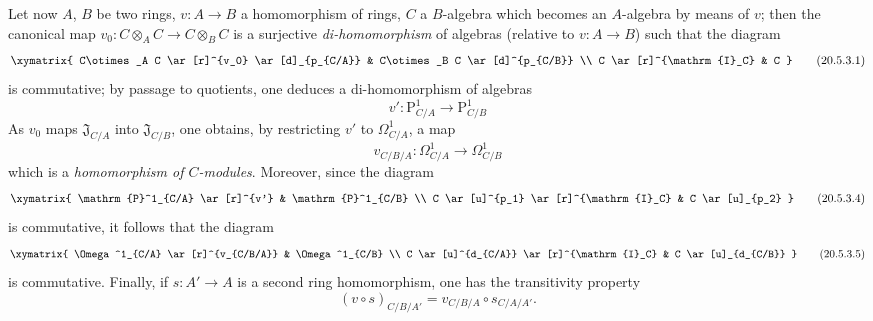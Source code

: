 \begin{env}[20.5.3]
\label{0.20.5.3}
Let now $A$, $B$ be two rings, $v:A\to B$ a homomorphism of rings, $C$ a $B$-algebra which becomes an $A$-algebra by means of $v$; then the canonical map $v_0:C\otimes_A C\to C\otimes_B C$ is a surjective \emph{di-homomorphism} of algebras (relative to $v:A\to B$) such that the diagram
\[
\xymatrix{
  C\otimes_A C \ar[r]^{v_0} \ar[d]_{p_{C/A}} & C\otimes_B C \ar[d]^{p_{C/B}} \\
  C \ar[r]^{\mathrm{I}_C} & C
}
\tag{20.5.3.1}
  \label{0.20.5.3.1}
\]
is commutative; by passage to quotients, one deduces a di-homomorphism of algebras
\begin{equation}
\tag{20.5.3.2}
  \label{0.20.5.3.2}
  v':\mathrm{P}^1_{C/A}\to\mathrm{P}^1_{C/B}
\end{equation}
As $v_0$ maps $\mathfrak{J}_{C/A}$ into $\mathfrak{J}_{C/B}$, one obtains, by restricting $v'$ to $\Omega^1_{C/A}$, a map
\begin{equation}
\tag{20.5.3.3}
  \label{0.20.5.3.3}
  v_{C/B/A}:\Omega^1_{C/A}\to\Omega^1_{C/B}
\end{equation}
which is a \emph{homomorphism of $C$-modules}.
Moreover, since the diagram
\begin{equation}
\label{0.20.5.3.4}
\xymatrix{
  \mathrm{P}^1_{C/A} \ar[r]^{v'} & \mathrm{P}^1_{C/B} \\
  C \ar[u]^{p_1} \ar[r]^{\mathrm{I}_C} & C \ar[u]_{p_2}
}
\tag{20.5.3.4}
\end{equation}
is commutative, it follows that the diagram
\[
\xymatrix{
  \Omega^1_{C/A} \ar[r]^{v_{C/B/A}} & \Omega^1_{C/B} \\
  C \ar[u]^{d_{C/A}} \ar[r]^{\mathrm{I}_C} & C \ar[u]_{d_{C/B}}
}
\tag{20.5.3.5}
  \label{0.20.5.3.5}
\]
is commutative.
Finally, if $s:A'\to A$ is a second ring homomorphism, one has the transitivity property
\begin{equation}
\tag{20.5.3.6}
  \label{0.20.5.3.6}
  (v\circ s)_{C/B/A'} = v_{C/B/A}\circ s_{C/A/A'}.
\end{equation}
\end{env}

